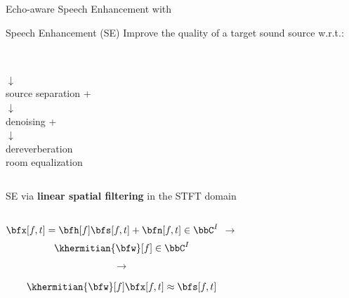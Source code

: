 \begin{frame}[t]{Echo-aware Speech Enhancement with \dechorate}
    \begin{mydefblock}{Speech Enhancement (SE)}
        Improve the quality of a \alert{target} sound source w.r.t.:
        \begin{columns}[T,onlytextwidth]
                \centering
                \\$\downarrow$
                \\source separation
            \centering
            +
                \centering
                \\$\downarrow$
                \\denoising
                \centering
                +
                \centering
                \\$\downarrow$
                \\dereverberation
                \\room equalization
        \end{columns}
    \end{mydefblock}

    \pause
    SE via \textbf{linear spatial filtering} in the STFT domain
    \begin{columns}[onlytextwidth]
        \centering
            $\bfx[f,t] = \bfh[f]\bfs[f,t] + \bfn[f,t]  \in \bbC^{I}$
        \centering
            $\longrightarrow$
        \centering
        \begin{align*}
            \khermitian{\bfw}[f] \in \bbC^{I} \\
        \end{align*}
        \centering
        \begin{align*}
            \longrightarrow \\
        \end{align*}
        \centering
        \begin{align*}
            \khermitian{\bfw}[f] \bfx[f,t] \approx \bfs[f,t] \\
        \end{align*}
    \end{columns}


\end{frame}
